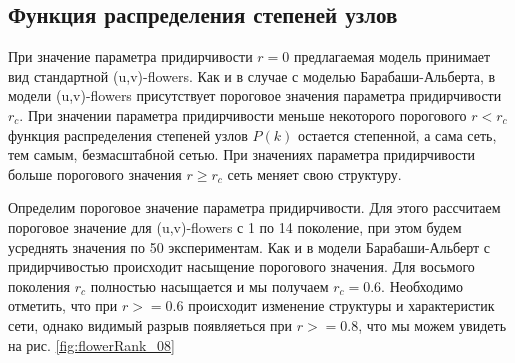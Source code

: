 \documentclass[10pt,aps,pra]{revtex4-1}
\begin{document}
\subsection{Функция распределения степеней узлов}

При значение параметра придирчивости $r=0$ предлагаемая модель принимает вид стандартной (u,v)-flowers. Как и в случае с моделью Барабаши-Альберта, в модели (u,v)-flowers присутствует пороговое значения параметра придирчивости $r_c$. При значении параметра придирчивости меньше некоторого порогового $r<r_c$ функция распределения степеней узлов $P(k)$ остается степенной, а сама сеть, тем самым, безмасштабной сетью. При значениях параметра придирчивости больше порогового значения $r \geq r_c$ сеть меняет свою структуру. 

Определим пороговое значение параметра придирчивости. Для этого рассчитаем пороговое значение для (u,v)-flowers с 1 по 14 поколение, при этом будем усреднять значения по 50 экспериментам. Как и в модели Барабаши-Альберт с придирчивостью происходит насыщение порогового значения. Для восьмого поколения $r_c$ полностью насыщается и мы получаем $r_c=0.6$. Необходимо отметить, что при $r>=0.6$ происходит изменение структуры и характеристик сети, однако видимый разрыв появляеться при $r>=0.8$, что мы можем увидеть на рис. \ref{fig:flowerRank_08}
\end{document}
